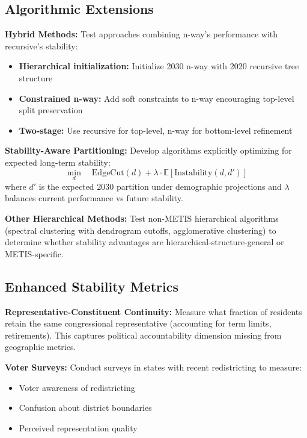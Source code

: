 \subsection{Algorithmic Extensions}

\textbf{Hybrid Methods:} Test approaches combining n-way's performance with recursive's stability:
\begin{itemize}
    \item \textbf{Hierarchical initialization:} Initialize 2030 n-way with 2020 recursive tree structure
    \item \textbf{Constrained n-way:} Add soft constraints to n-way encouraging top-level split preservation
    \item \textbf{Two-stage:} Use recursive for top-level, n-way for bottom-level refinement
\end{itemize}

\textbf{Stability-Aware Partitioning:} Develop algorithms explicitly optimizing for expected long-term stability:
$$\min_{d} \quad \text{EdgeCut}(d) + \lambda \cdot \mathbb{E}[\text{Instability}(d, d')]$$
where $d'$ is the expected 2030 partition under demographic projections and $\lambda$ balances current performance vs future stability.

\textbf{Other Hierarchical Methods:} Test non-METIS hierarchical algorithms (spectral clustering with dendrogram cutoffs, agglomerative clustering) to determine whether stability advantages are hierarchical-structure-general or METIS-specific.

\subsection{Enhanced Stability Metrics}

\textbf{Representative-Constituent Continuity:} Measure what fraction of residents retain the same congressional representative (accounting for term limits, retirements). This captures political accountability dimension missing from geographic metrics.

\textbf{Voter Surveys:} Conduct surveys in states with recent redistricting to measure:
\begin{itemize}
    \item Voter awareness of redistricting
    \item Confusion about district boundaries
    \item Perceived representation quality
\end{itemize}


